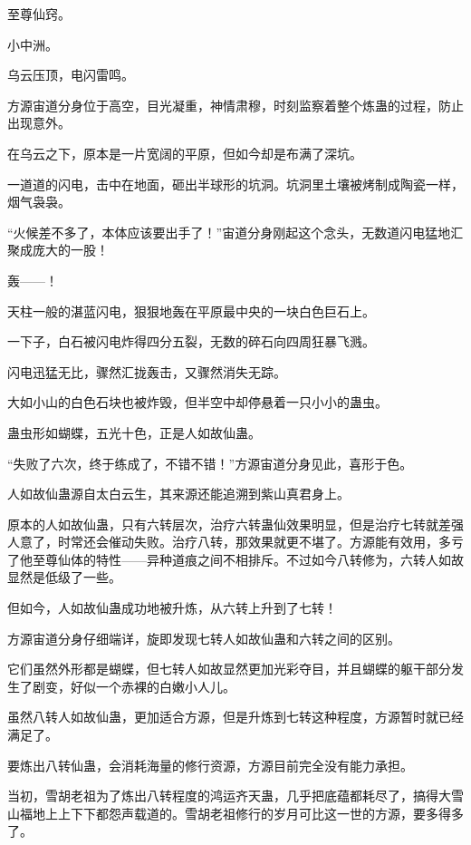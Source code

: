 
\begin{this_body}

至尊仙窍。

小中洲。

乌云压顶，电闪雷鸣。

方源宙道分身位于高空，目光凝重，神情肃穆，时刻监察着整个炼蛊的过程，防止出现意外。

在乌云之下，原本是一片宽阔的平原，但如今却是布满了深坑。

一道道的闪电，击中在地面，砸出半球形的坑洞。坑洞里土壤被烤制成陶瓷一样，烟气袅袅。

“火候差不多了，本体应该要出手了！”宙道分身刚起这个念头，无数道闪电猛地汇聚成庞大的一股！

轰——！

天柱一般的湛蓝闪电，狠狠地轰在平原最中央的一块白色巨石上。

一下子，白石被闪电炸得四分五裂，无数的碎石向四周狂暴飞溅。

闪电迅猛无比，骤然汇拢轰击，又骤然消失无踪。

大如小山的白色石块也被炸毁，但半空中却停悬着一只小小的蛊虫。

蛊虫形如蝴蝶，五光十色，正是人如故仙蛊。

“失败了六次，终于练成了，不错不错！”方源宙道分身见此，喜形于色。

人如故仙蛊源自太白云生，其来源还能追溯到紫山真君身上。

原本的人如故仙蛊，只有六转层次，治疗六转蛊仙效果明显，但是治疗七转就差强人意了，时常还会催动失败。治疗八转，那效果就更不堪了。方源能有效用，多亏了他至尊仙体的特性——异种道痕之间不相排斥。不过如今八转修为，六转人如故显然是低级了一些。

但如今，人如故仙蛊成功地被升炼，从六转上升到了七转！

方源宙道分身仔细端详，旋即发现七转人如故仙蛊和六转之间的区别。

它们虽然外形都是蝴蝶，但七转人如故显然更加光彩夺目，并且蝴蝶的躯干部分发生了剧变，好似一个赤裸的白嫩小人儿。

虽然八转人如故仙蛊，更加适合方源，但是升炼到七转这种程度，方源暂时就已经满足了。

要炼出八转仙蛊，会消耗海量的修行资源，方源目前完全没有能力承担。

当初，雪胡老祖为了炼出八转程度的鸿运齐天蛊，几乎把底蕴都耗尽了，搞得大雪山福地上上下下都怨声载道的。雪胡老祖修行的岁月可比这一世的方源，要多得多了。


\end{this_body}
